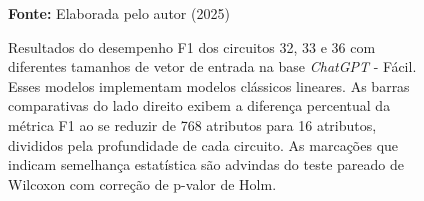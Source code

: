 \begin{figure}
\caption{Resultados do desempenho F1 dos circuitos 32, 33 e 36 com diferentes tamanhos de vetor de entrada na base \textit{ChatGPT} - Fácil. Esses modelos implementam modelos clássicos lineares. As barras comparativas do lado direito exibem a diferença percentual da métrica F1 ao se reduzir de 768 atributos para 16 atributos, divididos pela profundidade de cada circuito. As marcações que indicam semelhança estatística são advindas do teste pareado de Wilcoxon com correção de p-valor de Holm.}
\label{fig:n_features:easy:g4}
     \centering
    \centering
      \par\medskip\ABNTEXfontereduzida\selectfont\textbf{Fonte:} Elaborada pelo autor (2025) \par\medskip
\end{figure}